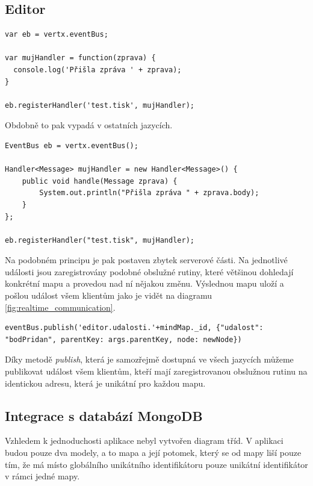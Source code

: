\subsection{Editor}

\begin{lstlisting}[caption=Zaregistrování obslužné rutiny v jazyce JavaScript]
var eb = vertx.eventBus;

var mujHandler = function(zprava) {
  console.log('Přišla zpráva ' + zprava);
}

eb.registerHandler('test.tisk', mujHandler);
\end{lstlisting}

Obdobně to pak vypadá v ostatních jazycích. 

\begin{lstlisting}[caption=Zaregistrování obslužné rutiny v jazyce Java]
EventBus eb = vertx.eventBus();

Handler<Message> mujHandler = new Handler<Message>() {
    public void handle(Message zprava) {
        System.out.println("Přišla zpráva " + zprava.body);
    }
};

eb.registerHandler("test.tisk", mujHandler);
\end{lstlisting}

Na podobném principu je pak postaven zbytek serverové části. Na jednotlivé události jsou zaregistrovány podobné obslužné rutiny, které většinou dohledají konkrétní mapu a provedou nad ní nějakou změnu. Výslednou mapu uloží a pošlou událost všem klientům jako je vidět na diagramu \ref{fig:realtime_communication}.

\begin{lstlisting}[caption=Publikování zprávy v jazyce JavaScript]
eventBus.publish('editor.udalosti.'+mindMap._id, {"udalost": "bodPridan", parentKey: args.parentKey, node: newNode})
\end{lstlisting}

Díky metodě \emph{publish}, která je samozřejmě dostupná ve všech jazycích můžeme publikovat událost všem klientům, kteří mají zaregistrovanou obslužnou rutinu na identickou adresu, která je unikátní pro každou mapu.

\vspace{0.5cm} %

\subsection{Integrace s databází MongoDB}

Vzhledem k jednoduchosti aplikace nebyl vytvořen diagram tříd. V aplikaci budou pouze dva modely, a to mapa a její potomek, který se od mapy liší pouze tím, že má místo globálního unikátního identifikátoru pouze unikátní identifikátor v rámci jedné mapy.

